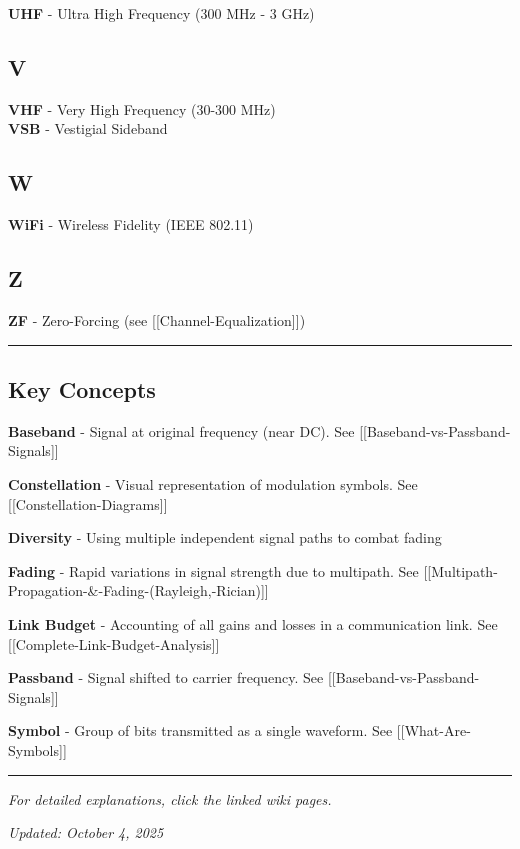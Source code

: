 \textbf{UHF} - Ultra High Frequency (300 MHz - 3 GHz)

\subsection{V}\label{v}

\textbf{VHF} - Very High Frequency (30-300 MHz)\\
\textbf{VSB} - Vestigial Sideband

\subsection{W}\label{w}

\textbf{WiFi} - Wireless Fidelity (IEEE 802.11)

\subsection{Z}\label{z}

\textbf{ZF} - Zero-Forcing (see {[}{[}Channel-Equalization{]}{]})

\begin{center}\rule{0.5\linewidth}{0.5pt}\end{center}

\subsection{Key Concepts}\label{key-concepts}

\textbf{Baseband} - Signal at original frequency (near DC). See
{[}{[}Baseband-vs-Passband-Signals{]}{]}

\textbf{Constellation} - Visual representation of modulation symbols.
See {[}{[}Constellation-Diagrams{]}{]}

\textbf{Diversity} - Using multiple independent signal paths to combat
fading

\textbf{Fading} - Rapid variations in signal strength due to multipath.
See {[}{[}Multipath-Propagation-\&-Fading-(Rayleigh,-Rician){]}{]}

\textbf{Link Budget} - Accounting of all gains and losses in a
communication link. See {[}{[}Complete-Link-Budget-Analysis{]}{]}

\textbf{Passband} - Signal shifted to carrier frequency. See
{[}{[}Baseband-vs-Passband-Signals{]}{]}

\textbf{Symbol} - Group of bits transmitted as a single waveform. See
{[}{[}What-Are-Symbols{]}{]}

\begin{center}\rule{0.5\linewidth}{0.5pt}\end{center}

\emph{For detailed explanations, click the linked wiki pages.}

\emph{Updated: October 4, 2025}

